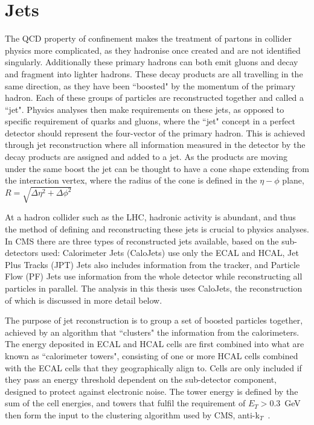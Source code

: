 \section{Jets}
\label{sec:reconjet}
 The QCD property of confinement makes the treatment of partons in collider physics more complicated, as they hadronise once created and are not identified singularly. Additionally these primary hadrons can both emit gluons and decay and fragment into lighter hadrons. These decay products are all travelling in the same direction, as they have been ``boosted" by the momentum of the primary hadron. Each of these groups of particles are reconstructed together and called a ``jet". Physics analyses then make requirements on these jets, as opposed to specific requirement of quarks and gluons, where the ``jet" concept in a perfect detector should represent the four-vector of the primary hadron. This is achieved through jet reconstruction where all information measured in the detector by the decay products are assigned and added to a jet. As the products are moving under the same boost the jet can be thought to have a cone shape extending from the interaction vertex, where the radius of the cone is defined in the $\eta-\phi$ plane, $R= \sqrt{\Delta \eta^{2} + \Delta \phi^{2}}$
 
 At a hadron collider such as the LHC, hadronic activity is abundant, and thus the method of defining and reconstructing these jets is crucial to physics analyses. In CMS there are three types of reconstructed jets available, based on the sub-detectors used: Calorimeter Jets (CaloJets) use only the ECAL and HCAL, Jet Plus Tracks (JPT) Jets also includes information from the tracker, and Particle Flow (PF) Jets use information from the whole detector while reconstructing all particles in parallel. The analysis in this thesis uses CaloJets, the reconstruction of which is discussed in more detail below. 
 
 The purpose of jet reconstruction is to group a set of boosted particles together, achieved by an algorithm that ``clusters" the information from the calorimeters. The energy deposited in ECAL and HCAL cells are first combined into what are known as ``calorimeter towers", consisting of one or more HCAL cells combined with the ECAL cells that they geographically align to. Cells are only included if they pass an energy threshold dependent on the sub-detector component, designed to protect against electronic noise. The tower energy is defined by the sum of the cell energies, and towers that fulfil the requirement of $E_{T} > 0.3$~GeV then form the input to the clustering algorithm used by CMS, anti-k$_{T}$~\cite{jetroundup}.

